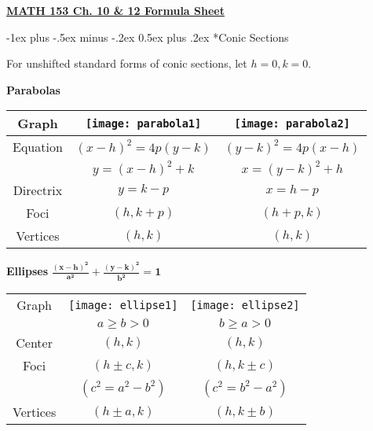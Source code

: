 \documentclass[10pt,landscape]{article}
\makeatletter
\renewcommand{\section}{\@startsection{section}{1}{0mm}%
                                {-1ex plus -.5ex minus -.2ex}%
                                {0.5ex plus .2ex}%
                                {\normalfont\large\bfseries}}
\makeatother
\begin{document}
\raggedright
\footnotesize
\begin{multicols*}{3}

\setlength{\premulticols}{1pt}
\setlength{\postmulticols}{1pt}
\setlength{\multicolsep}{1pt}
\setlength{\columnsep}{2pt}

\begin{center}
     \textbf{\large{\underline{MATH 153 Ch. 10 \& 12  Formula Sheet}}} \\
\end{center}

\section*{Conic Sections}

For unshifted standard forms of conic sections, let $h = 0, k = 0$.
\begin{center}	
	{\tabulinesep=0.5mm
	\textbf{Parabolas}
	\begin{tabu} to \columnwidth {||c | c | c||}
	\hline
		Graph & \texttt{[image: parabola1]} & 
				\texttt{[image: parabola2]} \\
		\hline
		Equation & $(x - h)^2 = 4p(y - k)$ & $(y - k)^2 = 4p(x - h)$ \\ 
		{} & $y = (x - h)^2 + k$ & $x = (y - k)^2 + h$\\
		\hline
		Directrix & $y = k - p$ & $x = h - p$ \\
		\hline
		Foci  & $(h, k + p)$ & $(h + p, k)$ \\
		\hline
		Vertices & $(h, k)$ & $(h, k)$ \\
	\hline
	\end{tabu}}
\end{center}
\begin{center}	
	{\tabulinesep=0.5mm
	\textbf{Ellipses} $\mathbf{\frac{(x - h)^2}{a^2} + \frac{(y - k)^2}{b^2} = 1}$
	\begin{tabu} to \columnwidth {||c | c | c||}
	\hline
		Graph & \texttt{[image: ellipse1]} & 
				\texttt{[image: ellipse2]} \\
		{} & {$a \geq b > 0$} & {$b \geq a > 0 $} \\
		\hline
		Center & $(h, k)$ & $(h, k)$ \\
		\hline
		Foci  & $(h \pm c, k)$ & $(h, k \pm c)$ \\
		{} & $ \scriptstyle (c^2 = a^2 - b^2)$ & $ \scriptstyle (c^2 = b^2 - a^2)$  \\
		\hline
		Vertices & $(h \pm a, k)$ & $(h, k \pm b)$ \\

\end{tabu}}
\end{center}
\end{multicols*}
\end{document}
